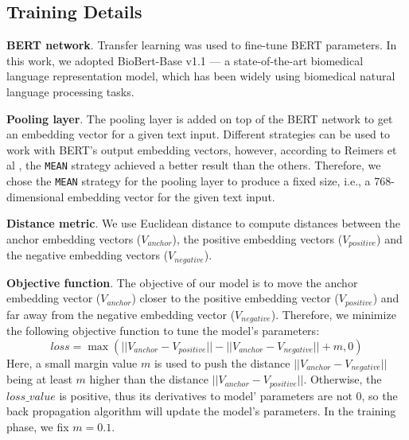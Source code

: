 \documentclass[preprint,12pt]{elsarticle}
\begin{document}


\subsection*{Training Details}
\label{sec:TrainingDetails}

\textbf{BERT network}. Transfer learning was used to fine-tune BERT parameters. In this work, we adopted BioBert-Base v1.1 \cite{Lee2019} --- a state-of-the-art biomedical language representation model, which has been widely using biomedical natural language processing tasks. 

\textbf{Pooling layer}. The pooling layer is added on top of the BERT network to get an embedding vector for a given text input. Different strategies can be used to work with BERT's output embedding vectors, however, according to Reimers et al \cite{Reimers2019}, the \texttt{MEAN} strategy achieved a better result than the others. Therefore, we chose the \texttt{MEAN} strategy for the pooling layer to produce a fixed size, i.e., a 768-dimensional embedding vector for the given text input.

\textbf{Distance metric}. We use Euclidean distance to compute distances between the anchor embedding vectors ($V_{anchor}$), the positive embedding vectors ($V_{positive}$) and the negative embedding vectors ($V_{negative}$).

\textbf{Objective function}. The objective of our model is to move the anchor embedding vector ($V_{anchor}$) closer to the positive embedding vector ($V_{positive}$) and far away from the negative embedding vector ($V_{negative}$). Therefore, we minimize the following objective function to tune the model's parameters:
\[ loss = \max(||V_{anchor} - V_{positive}|| - ||V_{anchor} - V_{negative}|| + m, 0)\]
Here, a small margin value $m$ is used to push the distance $||V_{anchor} - V_{negative}||$ being at least $m$ higher than the distance $||V_{anchor} - V_{positive}||$. Otherwise, the $loss\_value$ is positive, thus its derivatives to model' parameters are not 0, so the back propagation algorithm will update the model's parameters. In the training phase, we fix $m = 0.1$.
\end{document}
